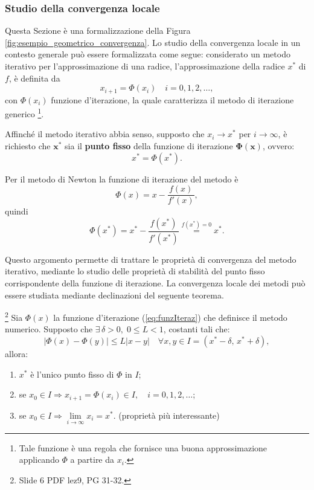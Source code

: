 \subsubsection{Studio della convergenza locale}
Questa Sezione è una formalizzazione della Figura \ref{fig:esempio_geometrico_convergenza}.
Lo studio della convergenza locale in un contesto generale può essere formalizzata come segue: considerato un metodo iterativo per l'approssimazione di una radice, l'approssimazione della radice $x^*$ di $f$, è definita da
\begin{equation}\label{eq:funzIteraz}
	x_{i+1}=\Phi (x_i)\quad i=0,1,2,\hdots,
\end{equation}
con $\Phi (x_i)$ funzione d'iterazione, la quale caratterizza il metodo di iterazione generico \footnote{Tale funzione è una regola che fornisce una buona approssimazione applicando $\Phi$ a partire da $x_i$.}.

Affinché il metodo iterativo abbia senso, supposto che $x_i\rightarrow x^*$ per $i\rightarrow\infty$, è richiesto che $\boldsymbol{x^*}$ sia il \textbf{punto fisso} della funzione di iterazione $\boldsymbol{\Phi(x)}$, ovvero:
\begin{equation*}
	x^*=\Phi (x^*).
\end{equation*}

\begin{definition}
	Per il metodo di Newton la funzione di iterazione del metodo è
	\begin{equation}\label{eq:funzIterazNewton}
		\Phi (x)=x-\frac{f(x)}{f'(x)},
	\end{equation}
	quindi
	\begin{equation*}
		\Phi (x^*)=x^*-\frac{f(x^*)}{f'(x^*)}\overset{f(x^*)=0}{=}x^*.
	\end{equation*}
\end{definition}

Questo argomento permette di trattare le proprietà di convergenza del metodo iterativo, mediante lo studio delle proprietà di stabilità del punto fisso corrispondente della funzione di iterazione. La convergenza locale dei metodi può essere studiata mediante declinazioni del seguente teorema.

\begin{theorem}\label{th:puntofisso}
	\footnote{Slide 6 PDF lez9, PG 31-32.}
	Sia $\Phi(x)$ la funzione d'iterazione (\ref{eq:funzIteraz}) che definisce il \gls{metodo numerico}. Supposto che $\exists\,\delta >0,\; 0\leq L<1$, costanti tali che:
	\begin{equation*}
		|\Phi (x)-\Phi (y)|\leq L|x-y| \quad\forall x,y \in I=(x^*-\delta,\, x^*+\delta),
	\end{equation*}
	allora:
	\begin{enumerate}
		\item $x^*$ è l'unico punto fisso di $\Phi$ in $I$;
		\item se $x_0 \in I\Rightarrow x_{i+1} = \Phi(x_i)\in I,\quad i=0,1,2,\hdots$;
		\item se $x_0\in I \Rightarrow \underset{{i\to\infty}}{\lim}{x_i}=x^*$. (proprietà più interessante)
	\end{enumerate}
\end{theorem}


